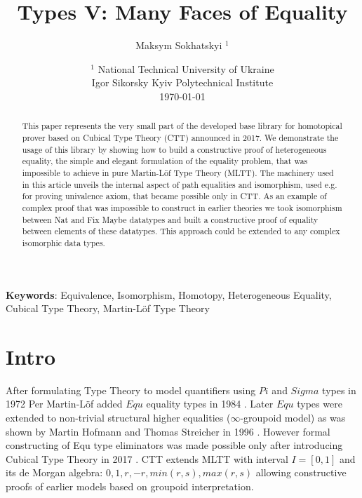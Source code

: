 \documentclass{article}
\begin{document}
\title{Types V: Many Faces of Equality}
\author{Maksym Sokhatskyi $^1$}
\date{
    $^1$ National Technical University of Ukraine \\
    \small Igor Sikorsky Kyiv Polytechnical Institute\\
    \today
}

\maketitle

\begin{abstract}
This paper represents the very small part of the developed base library for homotopical
prover based on Cubical Type Theory (CTT) announced in 2017. We demonstrate the usage
of this library by showing how to build a constructive proof of heterogeneous equality,
the simple and elegant formulation of the equality problem, that was impossible to achieve
in pure Martin-Löf Type Theory (MLTT). The machinery used in this article unveils
the internal aspect of path equalities and isomorphism, used e.g. for proving univalence
axiom, that became possible only in CTT. As an example of complex proof that was
impossible to construct in earlier theories we took isomorphism between Nat and Fix Maybe
datatypes and built a constructive proof of equality between elements of these datatypes.
This approach could be extended to any complex isomorphic data types.
\end{abstract}

{\bf Keywords}: Equivalence, Isomorphism, Homotopy,
                Heterogeneous Equality, Cubical Type Theory,
                Martin-Löf Type Theory


\section{Intro}

After formulating Type Theory to model quantifiers using $Pi$ and $Sigma$ types in 1972 \cite{Lof72}
Per Martin-Löf added $Equ$ equality types in 1984 \cite{Lof84}. Later $Equ$ types were extended
to non-trivial structural higher equalities ($\infty$-groupoid model) as was shown by Martin Hofmann
and Thomas Streicher in 1996 \cite{Hofmann96}. However formal constructing of Equ type
eliminators was made possible only after introducing Cubical Type Theory in 2017 \cite{Mortberg17}.
CTT extends MLTT with interval $I=[0,1]$ and its de Morgan algebra: $0, 1, r, -r, min(r,s), max(r,s)$
allowing constructive proofs of earlier models based on groupoid interpretation.
\end{document}
